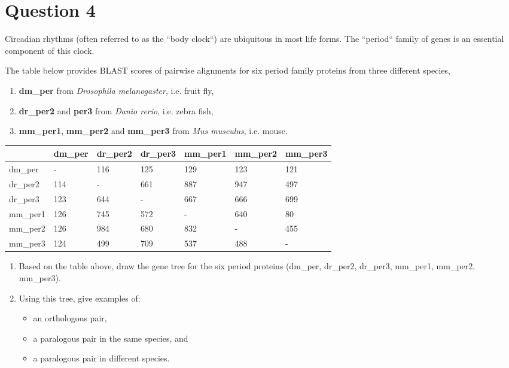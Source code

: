 \documentclass[a4paper,11pt]{article}
\begin{document}
\section*{Question 4}

Circadian rhythms (often referred to as the ``body clock``) are
ubiquitous in most life forms. The ``period`` family of genes is an 
essential component of this clock.

The table below provides BLAST scores of pairwise
alignments for six period family proteins from three different
species, 

\begin{enumerate}
\item {\bf dm\_per} from {\it Drosophila melanogaster}, i.e. fruit fly,
\item {\bf dr\_per2} and {\bf per3} from {\it Danio rerio}, i.e. zebra fish,
\item {\bf mm\_per1}, {\bf mm\_per2} and {\bf mm\_per3} from {\it Mus
  musculus}, i.e. mouse.
\end{enumerate}

\begin{center}
	\begin{tabular} {| l || l | l | l | l | l | l |}
	\hline
 	& dm\_per & dr\_per2 & dr\_per3 & mm\_per1 & mm\_per2 & mm\_per3 \\ \hline\hline
	dm\_per & -  & 116 & 125 & 129 & 123 & 121 \\	\hline
	dr\_per2 &	114 & - & 661 & 887 & 947& 497 \\	\hline
	dr\_per3 & 123 & 644 & - & 667 & 666 & 699 \\	\hline
	mm\_per1 & 126 & 745 & 572 & - & 640 & 80 \\	\hline
	mm\_per2 & 126 & 984 & 680 & 832 & - & 455 \\	\hline
	mm\_per3 & 124 & 499 & 709 & 537 & 488 & - \\
	\hline
	\end{tabular}
\end{center}
\vspace{0.05 cm}

\begin{enumerate}
\item Based on the table above, draw the gene tree for the six period
  proteins (dm\_per, dr\_per2, dr\_per3,  mm\_per1, mm\_per2,
  mm\_per3). 
\item Using this tree, give examples of:
  \begin{itemize} 
  \item an orthologous pair, 
  \item a paralogous pair in the same species, and 
  \item a paralogous pair in different species.
  \end{itemize}
\end{enumerate}
\end{document}
